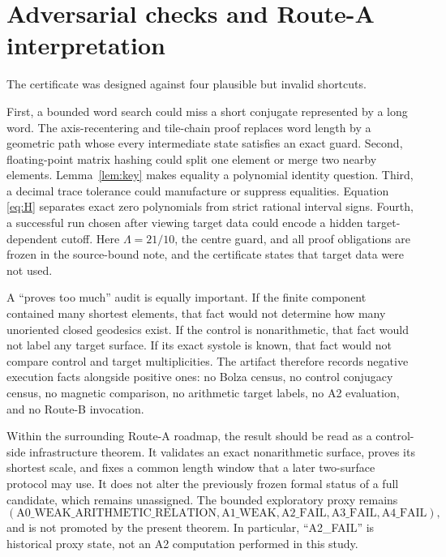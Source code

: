 \documentclass[11pt,a4paper]{article}
\theoremstyle{definition}
\begin{document}
\section{Adversarial checks and Route-A interpretation}

The certificate was designed against four plausible but invalid shortcuts.

First, a bounded word search could miss a short conjugate represented by a
long word.  The axis-recentering and tile-chain proof replaces word length by
a geometric path whose every intermediate state satisfies an exact guard.
Second, floating-point matrix hashing could split one element or merge two
nearby elements.  Lemma~\ref{lem:key} makes equality a polynomial identity
question.  Third, a decimal trace tolerance could manufacture or suppress
equalities.  Equation \eqref{eq:H} separates exact zero polynomials from
strict rational interval signs.  Fourth, a successful run chosen after
viewing target data could encode a hidden target-dependent cutoff.  Here
\(\Lambda=21/10\), the centre guard, and all proof obligations are frozen in
the source-bound note, and the certificate states that target data were not
used.

A ``proves too much'' audit is equally important.  If the finite component
contained many shortest elements, that fact would not determine how many
unoriented closed geodesics exist.  If the control is nonarithmetic, that fact
would not label any target surface.  If its exact systole is known, that fact
would not compare control and target multiplicities.  The artifact therefore
records negative execution facts alongside positive ones: no Bolza census,
no control conjugacy census, no magnetic comparison, no arithmetic target
labels, no A2 evaluation, and no Route-B invocation.

Within the surrounding Route-A roadmap, the result should be read as a
control-side infrastructure theorem.  It validates an exact nonarithmetic
surface, proves its shortest scale, and fixes a common length window that a
later two-surface protocol may use.  It does not alter the previously frozen
formal status of a full candidate, which remains unassigned.  The bounded
exploratory proxy remains
\[
 (\mathrm{A0\_WEAK\_ARITHMETIC\_RELATION},
  \mathrm{A1\_WEAK},
  \mathrm{A2\_FAIL},
  \mathrm{A3\_FAIL},
  \mathrm{A4\_FAIL}),
\]
and is not promoted by the present theorem.  In particular, ``A2\_FAIL'' is
historical proxy state, not an A2 computation performed in this study.
\end{document}
